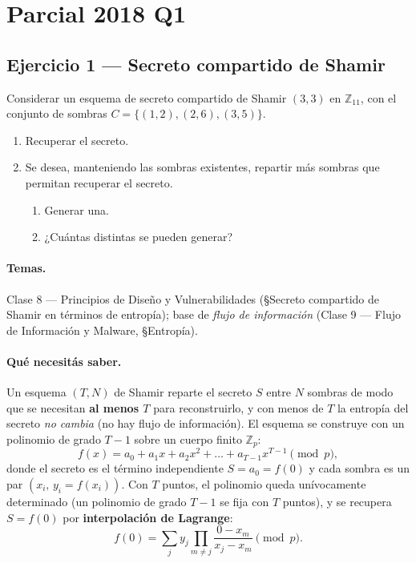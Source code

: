 \section{Parcial 2018 Q1}

\subsection{Ejercicio 1 — Secreto compartido de Shamir}

\begin{consigna}
Considerar un esquema de secreto compartido de Shamir $(3,3)$ en $\mathbb{Z}_{11}$, con el
conjunto de sombras $C = \{(1,2),(2,6),(3,5)\}$.
\begin{enumerate}[label=\alph*)]
  \item Recuperar el secreto.
  \item Se desea, manteniendo las sombras existentes, repartir más sombras que permitan
        recuperar el secreto.
        \begin{enumerate}[label=\roman*.]
          \item Generar una.
          \item ¿Cuántas distintas se pueden generar?
        \end{enumerate}
\end{enumerate}
\end{consigna}

\paragraph{Temas.} Clase 8 — Principios de Diseño y Vulnerabilidades (\S Secreto compartido de
Shamir en términos de entropía); base de \emph{flujo de información} (Clase 9 — Flujo de
Información y Malware, \S Entropía).

\paragraph{Qué necesitás saber.} Un esquema $(T,N)$ de Shamir reparte el secreto $S$ entre
$N$ sombras de modo que se necesitan \textbf{al menos $T$} para reconstruirlo, y con menos de
$T$ la entropía del secreto \emph{no cambia} (no hay flujo de información). El esquema se
construye con un polinomio de grado $T-1$ sobre un cuerpo finito $\mathbb{Z}_p$:
\begin{equation*}
  f(x) = a_0 + a_1 x + a_2 x^2 + \dots + a_{T-1} x^{T-1} \pmod{p},
\end{equation*}
donde el secreto es el término independiente $S = a_0 = f(0)$ y cada sombra es un par
$(x_i,\, y_i=f(x_i))$. Con $T$ puntos, el polinomio queda unívocamente determinado (un
polinomio de grado $T-1$ se fija con $T$ puntos), y se recupera $S=f(0)$ por
\textbf{interpolación de Lagrange}:
\begin{equation*}
  f(0) = \sum_{j} y_j \prod_{m \neq j} \frac{0 - x_m}{x_j - x_m} \pmod{p}.
\end{equation*}

